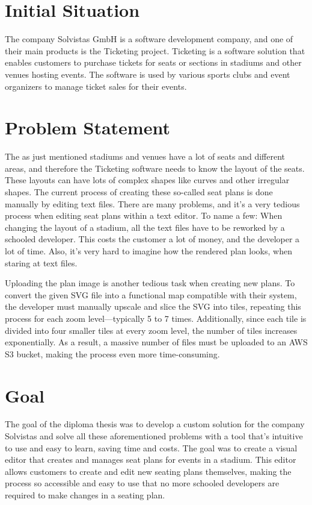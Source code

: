 \section{Initial Situation}
The company Solvistas GmbH is a software development company, and one of their main products is the Ticketing project. Ticketing is a software solution that enables customers to purchase tickets for seats or sections in stadiums and other venues hosting events. The software is used by various sports clubs and event organizers to manage ticket sales for their events.


\section{Problem Statement}
The as just mentioned stadiums and venues have a lot of seats and different areas, and therefore the Ticketing software needs to know the layout of the seats. These layouts can have lots of complex shapes like curves and other irregular shapes. The current process of creating these so-called seat plans is done manually by editing text files. There are many problems, and it's a very tedious process when editing seat plans within a text editor. To name a few: When changing the layout of a stadium, all the text files have to be reworked by a schooled developer. This costs the customer a lot of money, and the developer a lot of time. Also, it's very hard to imagine how the rendered plan looks, when staring at text files.

Uploading the plan image is another tedious task when creating new plans. To convert the given SVG file into a functional map compatible with their system, the developer must manually upscale and slice the SVG into tiles, repeating this process for each zoom level—typically 5 to 7 times. Additionally, since each tile is divided into four smaller tiles at every zoom level, the number of tiles increases exponentially. As a result, a massive number of files must be uploaded to an AWS S3 bucket, making the process even more time-consuming.

\section{Goal}
The goal of the diploma thesis was to develop a custom solution for the company Solvistas and solve all these aforementioned problems with a tool that's intuitive to use and easy to learn, saving time and costs. The goal was to create a visual editor that creates and manages seat plans for events in a stadium. This editor allows customers to create and edit new seating plans themselves, making the process so accessible and easy to use that no more schooled developers are required to make changes in a seating plan.